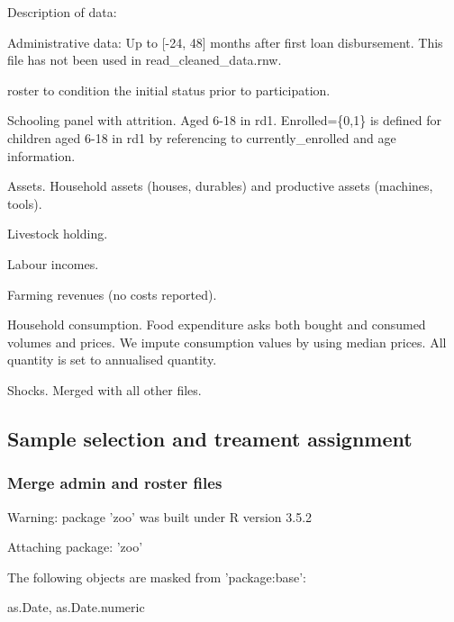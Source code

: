 Description of data:
\begin{description}
\vspace{1.0ex}\setlength{\itemsep}{1.0ex}\setlength{\baselineskip}{12pt}
\item[ad]	Administrative data: Up to [-24, 48] months after first loan disbursement. This file has not been used in \textsf{read\_cleaned\_data.rnw}.
\item[ros]	 \textsf{roster} to condition the initial status prior to participation.
\item[sch]	Schooling panel with attrition. Aged 6-18 in rd1. \textsf{Enrolled=\{0,1\}} is defined for children aged 6-18 in rd1 by referencing to \textsf{currently\_enrolled} and age information.
\item[ass]	 Assets. Household assets (houses, durables) and productive assets (machines, tools). 
\item[lvo]	Livestock holding. 
\item[lab]	Labour incomes.
\item[far]	Farming revenues (no costs reported).
\item[con]	Household consumption. Food expenditure asks both bought and consumed volumes and prices. We impute consumption values by using median prices. All quantity is set to annualised quantity.
\item[shk]	Shocks. Merged with all other files.
\end{description}

\subsection{Sample selection and treament assignment}

\subsubsection{Merge admin and roster files}





\begin{Schunk}
\begin{Soutput}
Warning: package 'zoo' was built under R version 3.5.2
\end{Soutput}
\begin{Soutput}

Attaching package: 'zoo'
\end{Soutput}
\begin{Soutput}
The following objects are masked from 'package:base':

    as.Date, as.Date.numeric
\end{Soutput}
\end{Schunk}


